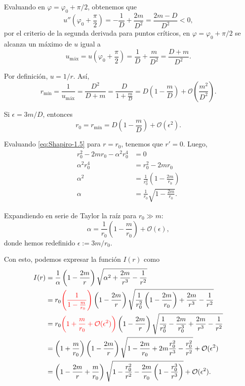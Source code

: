 \documentclass[letterpaper,11pt]{article}
\begin{document}
Evaluando en $\varphi = \varphi_0 + \pi/2$, obtenemos que
\begin{equation}
u''\left(\varphi_0 + \frac{\pi}{2}\right) = - \frac{1}{D} + \frac{2m}{D^2} = \frac{2m -D}{D^2} < 0,
\end{equation}
por el criterio de la segunda derivada para puntos críticos, en  $\varphi = \varphi_0 + \pi/2$ se alcanza un máximo de $u$ igual a
\begin{equation}
u_{\text{máx}} = u\left(\varphi_0 + \frac{\pi}{2}\right) = \frac{1}{D} + \frac{m}{D^2} = \frac{D + m}{D^2}.
\end{equation}

Por definición, $u = 1/r$. Así,
\begin{equation}
r_{\text{mín}} = \frac{1}{u_{\text{máx}}} = \frac{D^2}{D+m} =  \frac{D}{1 + \frac{m}{D}} = D \left( 1 - \frac{m}{D} \right) + \mathcal{O}\left( \frac{m^2}{D^2}\right).
\end{equation}

Si $\epsilon = 3m/D$, entonces
\begin{equation}
r_0 = r_{\text{mín}} = D\left(1 - \frac{m}{D}\right) + \mathcal{O}(\epsilon^2).
\end{equation}

Evaluando \eqref{eq:Shapiro-1.5} para $r = r_0$, tenemos que $r' = 0$.  Luego,
\begin{align}
r_0^2 -2mr_0 - \alpha^2 r_0^4 &= 0 \\
\alpha^2 r_0^4 &= r_0^2 - 2mr_0 \\
\alpha^2 &= \frac{1}{r_0^2} \left(1 - \frac{2m}{r_0} \right) \\
\alpha &= \frac{1}{r_0} \sqrt{1 - \frac{2m}{r_0}}.
\end{align}

Expandiendo en serie de Taylor la raíz para $r_0 \gg m$:
\begin{equation}
\alpha = \frac{1}{r_0}\left(1 - \frac{m}{r_0}\right) + \mathcal{O}\left(\epsilon\right),
\end{equation}
donde hemos redefinido $\epsilon := 3m/r_0$.

Con esto, podemos expresar la función $I(r)$ como 
\begin{align}
I(r) &= \frac{1}{\alpha}\left( 1 - \frac{2m}{r}\right)\sqrt{\alpha^2 + \frac{2m}{r^3} - \frac{1}{r^2}} \nonumber\\
&= r_0 \textcolor{red}{\left(\frac{1}{1-\frac{m}{r_0}}\right)} \left(1 - \frac{2m}{r} \right) \sqrt{\frac{1}{r_0^2}\left( 1 - \frac{2m}{r_0}\right) + \frac{2m}{r^3} - \frac{1}{r^2}} \nonumber \\
&= r_0 \textcolor{red}{\left(1 + \frac{m}{r_0} + \mathcal{O}(\epsilon^2) \right)} \left(1 - \frac{2m}{r}\right) \sqrt{\frac{1}{r_0^2} - \frac{2m}{r_0^3} + \frac{2m}{r^3} - \frac{1}{r^2}} \nonumber\\
&= \left( 1 + \frac{m}{r_0} \right) \left( 1 - \frac{2m}{r}\right) \sqrt{1 - \frac{2m}{r_0} + 2m \frac{r_0^2}{r^3} - \frac{r_0^2}{r^2}} + \mathcal{O}(\epsilon^2) \nonumber\\
&= \left( 1 - \frac{2m}{r} + \frac{m}{r_0}\right) \sqrt{1 - \frac{r_0^2}{r^2} - \frac{2m}{r_0}\left( 1 - \frac{r_0^3}{r^3}\right)} + \mathcal{O}(\epsilon^2). \label{eq:Shapiro-7}
\end{align}
\end{document}
